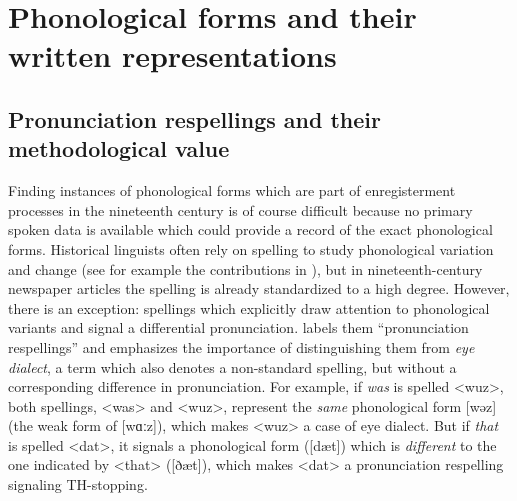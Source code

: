 \section{Phonological forms and their written representations}
\label{bkm:Ref523382115}\hypertarget{Toc63021221}{}\label{bkm:Ref523762430}\subsection{Pronunciation respellings and their methodological value}
\label{bkm:Ref528410938}\hypertarget{Toc63021222}{}
Finding instances of phonological forms which are part of enregisterment processes in the nineteenth century is of course difficult because no primary spoken data is available which could provide a record of the exact phonological forms. Historical linguists often rely on spelling to study phonological variation and change (see for example the contributions in \citealt{Hickey2010}), but in nineteenth-century newspaper articles the spelling is already standardized to a high degree. However, there is an exception: spellings which explicitly draw attention to phonological variants and signal a differential pronunciation. \citet{Picone2016} labels them “pronunciation respellings” and emphasizes the importance of distinguishing them from \textit{eye dialect}, a term which also denotes a non-standard spelling, but without a corresponding difference in pronunciation. For example, if \emph{was} is spelled <wuz>, both spellings, <was> and <wuz>, represent the \emph{same} phonological form [wəz] (the weak form of [wɑːz]), which makes <wuz> a case of eye dialect. But if \emph{that} is spelled <dat>, it signals a phonological form ([dæt]) which is \emph{different} to the one indicated by <that> ([ðæt]), which makes <dat> a pronunciation respelling signaling TH-stopping.



